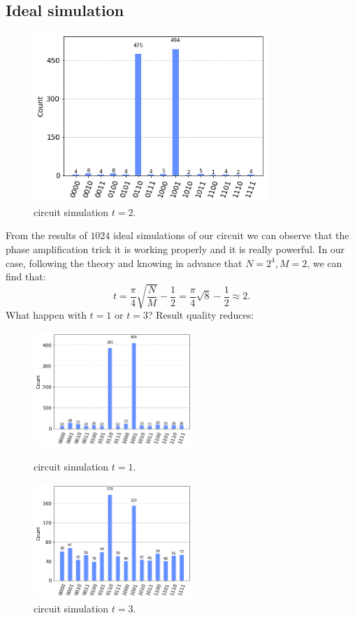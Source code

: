 \documentclass{article}
\begin{document}
\subsection{Ideal simulation}
\begin{figure}[H]
  \centering
  \includegraphics[width=250pt]{Img/histogram.png}
  \caption{circuit simulation $t=2$.}
\end{figure}
From the results of $1024$ ideal simulations of our circuit we can observe that
the phase amplification trick it is working properly and it is really powerful.
In our case, following the theory and knowing in advance that $N = 2^4, M=2$,
we can find that:
\[
  t = \frac{\pi}{4} \sqrt{\frac{N}{M}}- \frac{1}{2} = \frac{\pi}{4}
  \sqrt{8}- \frac{1}{2} \approx 2.
\]
What happen with $t= 1$ or $t=3$? Result quality reduces:
\begin{figure}[H]
  \centering
  \begin{minipage}{.5\textwidth}
    \centering
    \includegraphics[width=6cm]{Img/histogram-t1.png}
    \caption{circuit simulation $t=1$.}
  \end{minipage}%
  \begin{minipage}{.5\textwidth}
    \centering
    \includegraphics[width=6cm]{Img/histogram-t3.png}
    \caption{circuit simulation $t=3$.}
  \end{minipage}
\end{figure}
\end{document}
